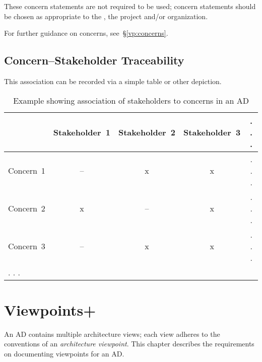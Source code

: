 \documentclass[10pt,oneside]{report}
\begin{document}
These concern statements are not required to be used; concern
statements should be chosen as appropriate to the
, the project and/or organization.

For further guidance on concerns, see~\S\ref{vp:concerns}.


\section{Concern--Stakeholder Traceability}


This association can be recorded via a simple table or other
depiction.

\begin{table}[h]
\caption{Example showing association of stakeholders to
  concerns in an AD}\label{table:SxC}
\begin{tabular}{ l | c | c | c | c }
   & \textsf{Stakeholder~1} & \textsf{Stakeholder~2} & \textsf{Stakeholder~3} &. . . \\
\hline
  \textsf{Concern~1} & -- & \textsf{x} & \textsf{x} & . . . \\
  \textsf{Concern~2} & \textsf{x} & -- & \textsf{x} & . . . \\
  \textsf{Concern~3} & -- & \textsf{x} & \textsf{x} & . . . \\
  . . . & & &  \\
\hline
\end{tabular}
\end{table}

\chapter{Viewpoints+}\label{ad:vps}

An AD contains multiple architecture views; each view adheres to the
conventions of an \textit{architecture viewpoint}. This chapter
describes the requirements on documenting viewpoints for an AD.



\end{document}
